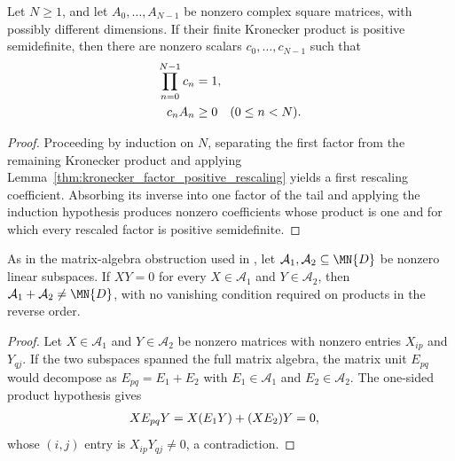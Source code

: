 \begin{lemma}%
    \label{thm:finite_kronecker_positive_rescaling}
    \leanok
    Let $N\geq1$, and let $A_0,\ldots,A_{N-1}$ be nonzero complex square
    matrices, with possibly different dimensions. If their finite Kronecker
    product is positive semidefinite, then there are nonzero scalars
    $c_0,\ldots,c_{N-1}$ such that
    \begin{align}
        \prod_{n=0}^{N-1}c_n & =1,
        \notag                                          \\
        c_nA_n               & \geq0 \quad (0\leq n<N).
        \notag
    \end{align}
\end{lemma}

\begin{proof}
    \leanok
    Proceeding by induction on $N$, separating the first factor from the
    remaining Kronecker product and applying
    Lemma~\ref{thm:kronecker_factor_positive_rescaling} yields a first
    rescaling coefficient. Absorbing its inverse into one factor of the tail
    and applying the induction hypothesis produces nonzero coefficients whose
    product is one and for which every rescaled factor is positive
    semidefinite.
\end{proof}

\begin{lemma}%
    \label{lem:matrix_one_sided_product_obstruction}
    \leanok
    As in the matrix-algebra obstruction used in
    \cite[Appendix~C.2, lines~1465--1470]{Cirac2016MPDO_arXiv}, let
    $\mathcal A_1,\mathcal A_2\subseteq\MN{D}$ be nonzero linear subspaces. If
    $XY=0$ for every $X\in\mathcal A_1$ and $Y\in\mathcal A_2$, then
    $\mathcal A_1+\mathcal A_2\ne\MN{D}$, with no vanishing condition required
    on products in the reverse order.
\end{lemma}

\begin{proof}
    \leanok
    Let $X\in\mathcal A_1$ and $Y\in\mathcal A_2$ be nonzero matrices with
    nonzero entries $X_{ip}$ and $Y_{qj}$. If the two subspaces spanned the
    full matrix algebra, the matrix unit $E_{pq}$ would decompose as
    $E_{pq}=E_1+E_2$ with $E_1\in\mathcal A_1$ and $E_2\in\mathcal A_2$. The
    one-sided product hypothesis gives
    \begin{align}
        XE_{pq}Y & =X(E_1Y)+(XE_2)Y=0,
        \notag
    \end{align}
    whose $(i,j)$ entry is $X_{ip}Y_{qj}\ne0$, a contradiction.
\end{proof}

